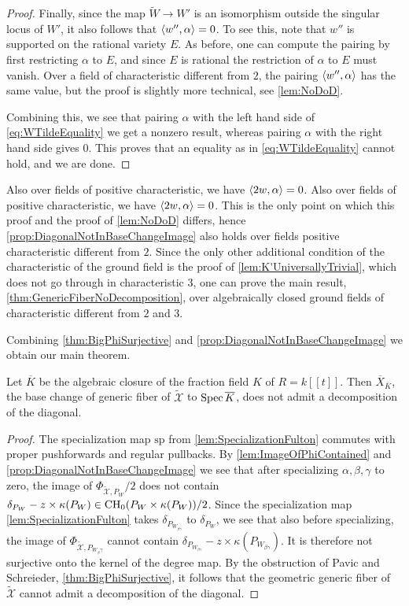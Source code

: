 \begin{proof}
Finally, since the map $\widetilde{W} \to W'$ is an isomorphism outside the singular locus of $W'$, it also follows that $\langle w'', \alpha\rangle = 0$. To see this, note that $w''$ is supported on the rational variety $E$. As before, one can compute the pairing by first restricting $\alpha$ to $E$, and since $E$ is rational the restriction of $\alpha$ to $E$ must vanish. Over a field of characteristic different from $2$, the pairing $\langle w'', \alpha\rangle$ has the same value, but the proof is slightly more technical, see \cref{lem:NoDoD}.

Combining this, we see that pairing $\alpha$ with the left hand side of \eqref{eq:WTildeEquality} we get a nonzero result, whereas pairing $\alpha$ with the right hand side gives $0$. This proves that an equality as in \eqref{eq:WTildeEquality} cannot hold, and we are done.
\end{proof}
Also over fields of positive characteristic, we have $\langle2w, \alpha\rangle = 0$. Also over fields of positive characteristic, we have $\langle2w, \alpha\rangle = 0$. This is the only point on which this proof and the proof of \cref{lem:NoDoD} differs, hence \cref{prop:DiagonalNotInBaseChangeImage} also holds over fields positive characteristic different from $2$. Since the only other additional condition of the characteristic of the ground field is the proof of \cref{lem:K'UniversallyTrivial}, which does not go through in characteristic $3$, one can prove the main result, \cref{thm:GenericFiberNoDecomposition}, over algebraically closed ground fields of characteristic different from $2$ and $3$.

Combining \cref{thm:BigPhiSurjective} and \cref{prop:DiagonalNotInBaseChangeImage} we obtain our main theorem.
\begin{theorem}
	\label{thm:GenericFiberNoDecomposition}
	Let $\overline{K}$ be the algebraic closure of the fraction field $K$ of $R = k[[t]]$. Then $\overline{X}_{\overline{K}}$, the base change of generic fiber of $\widetilde{\mathcal{X}}$ to $\operatorname{Spec} \overline{K}$, does not admit a decomposition of the diagonal.
\end{theorem}
\begin{proof}
	The specialization map $\mathrm{sp}$ from \cref{lem:SpecializationFulton} commutes with proper pushforwards and regular pullbacks.
	By \cref{lem:ImageOfPhiContained} and \cref{prop:DiagonalNotInBaseChangeImage} we see that after specializing $\alpha, \beta, \gamma$ to zero, the image of $\Phi_{\widetilde{\mathcal{X}},P_W}/2$ does not contain $\delta_{P_W} - z \times \kappa(P_W) \in \operatorname{CH}_0(P_W \times \kappa(P_W))/2$. Since the specialization map \cref{lem:SpecializationFulton} takes $\delta_{P_{W_{\beta \gamma}}}$ to $\delta_{P_W}$, we see that also before specializing, the image of $\Phi_{\widetilde{\mathcal{X}},P_{W_\beta \gamma}}$ cannot contain $\delta_{P_{W_{\beta \gamma}}} - z \times \kappa(P_{W_{\beta \gamma}})$. It is therefore not surjective onto the kernel of the degree map. By the obstruction of Pavic and Schreieder,  \cref{thm:BigPhiSurjective}, it follows that the geometric generic fiber of $\widetilde{\mathcal{X}}$ cannot admit a decomposition of the diagonal.
\end{proof}

